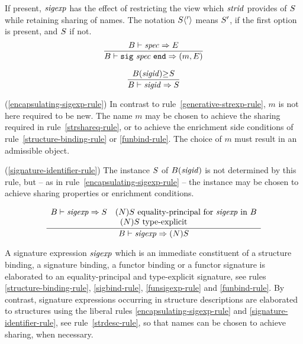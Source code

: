 \comment If present, $\sigexp$ has the effect of restricting the
view which $\strid$ provides of $\S$ while retaining sharing of names. 
The notation $\S\langle'\rangle$ means $\S'$, if the first option is present,
and $\S$ if not.
%
%
\begin{equation}		%
\label{encapsulating-sigexp-rule}
\frac{\B\ts\spec\ra\E }
     {\B\ts\encsigexp\ra (\m,\E)}\index{41.2}
\end{equation}

\begin{equation}		%
\label{signature-identifier-rule}
\frac{ \sigord{\B(\sigid)}{}{\S} }
     { \B\ts\sigid\ra\S }
\end{equation}
\comments
\begin{description}
\item{(\ref{encapsulating-sigexp-rule})}
   In contrast to rule~\ref{generative-strexp-rule}, $m$ is not here 
required to be new. 
The name $m$ may be chosen to achieve the sharing required
in rule~\ref{strshareq-rule}, or to achieve the enrichment side conditions
of rule~\ref{structure-binding-rule} or \ref{funbind-rule}. 
The choice of $m$ must result in an admissible object.
\item{(\ref{signature-identifier-rule})}
   The instance $\S$ of $\B(\sigid)$ is not determined by this rule,
but -- as in rule~\ref{encapsulating-sigexp-rule} -- the instance
may  be chosen to achieve sharing properties or enrichment
conditions.
\end{description}

\begin{equation}		%
\label{topmost-sigexp-rule}
\frac{\begin{array}{c}
\B\ts\sigexp\ra\S\quad\mbox{$(\N)\S$ equality-principal for $\sigexp$ in $\B$}\\
\mbox{$(\N)\S$ type-explicit}
      \end{array}}
     {\B\ts\sigexp\ra (\N)\S}\index{41.25}
\end{equation}

\comment
A signature expression $\sigexp$ which is an immediate constituent of
a structure binding, a signature binding, a functor binding or a
functor signature is elaborated to an equality-principal and type-explicit
signature, see rules \ref{structure-binding-rule}, \ref{sigbind-rule}, 
\ref{funsigexp-rule} and \ref{funbind-rule}.  By contrast, signature 
expressions occurring in structure descriptions are elaborated to
structures using the liberal rules
\ref{encapsulating-sigexp-rule} and \ref{signature-identifier-rule}, 
see rule~\ref{strdesc-rule}, so that names can be chosen to achieve
sharing, when necessary.

